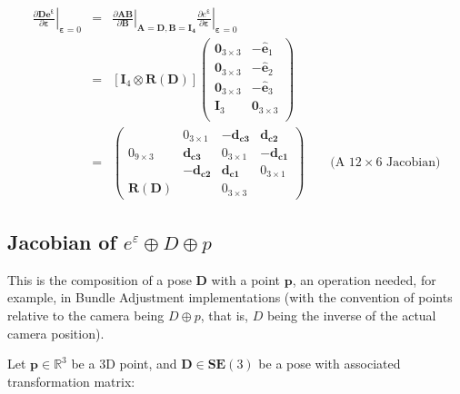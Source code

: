 \documentclass[a4paper,11pt]{report}
\newcommand{\E}{{\bm{\varepsilon}}}
\begin{document}
\begin{eqnarray}
\left. \frac{\partial \mathbf{D e^\E}}{\partial \E} \right|_{\E = 0}
&=&
\left. \frac{\partial \mathbf{A} \mathbf{B}}{\partial \mathbf{B} } \right|_{\mathbf{A}=\mathbf{D}, \mathbf{B}=\mathbf{I_4}}
\left. \frac{\partial e^\E}{\partial \E} \right|_{\E=0}
\\
&=&
\left[ \mathbf{I}_4 \otimes \mathbf{R}(\mathbf{D}) \right]
\left(
\begin{array}{cc}
 \mathbf{0}_{3\times 3}  & -\hat{\mathbf{e}}_1 \\
 \mathbf{0}_{3\times 3}  & -\hat{\mathbf{e}}_2 \\
 \mathbf{0}_{3\times 3}  & -\hat{\mathbf{e}}_3 \\
 \mathbf{I}_{3}  & \mathbf{0}_{3\times 3} \\
\end{array}
\right)
\\
&=&
\left(
\begin{array}{c|ccc}
  ~  &  0_{3\times 1}  & -\mathbf{d_{c3}} & \mathbf{d_{c2}} \\
  0_{9\times 3}
     & \mathbf{d_{c3}} & 0_{3\times 1} & -\mathbf{d_{c1}} \\
  ~  &  -\mathbf{d_{c2}} & \mathbf{d_{c1}} & 0_{3\times 1} \\
\hline
  \mathbf{R}(\mathbf{D})   & ~ & 0_{3 \times 3} &
\end{array}
\right)
\quad\quad \text{(A $12 \times 6$ Jacobian)}
\end{eqnarray}



\subsection{Jacobian of $e^\varepsilon \oplus D \oplus p$}
\label{sect:jacob_eDp}

This is the composition of a pose $\mathbf{D}$ with a point $\mathbf{p}$,
an operation needed, for example, in Bundle Adjustment implementations \cite{triggs2000bundle}
(with the convention of points relative to the camera being $D \oplus p$, that is,
$D$ being the inverse of the actual camera position).

Let $\mathbf{p} \in \mathbb{R}^3$ be a 3D point, and
$\mathbf{D} \in \mathbf{SE}(3)$ be a pose with associated transformation matrix:
\end{document}
